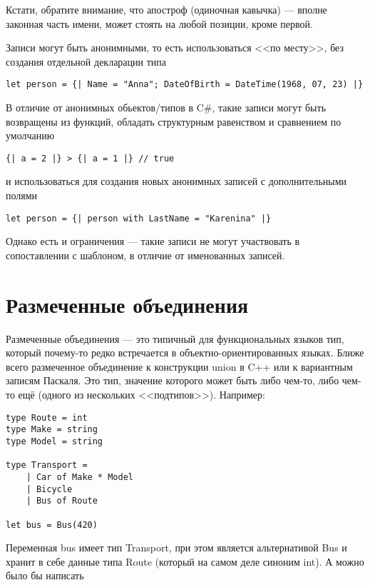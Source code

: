 \documentclass{../../text-style}
\begin{document}
Кстати, обратите внимание, что апостроф (одиночная кавычка) --- вполне законная часть имени, может стоять на любой позиции, кроме первой.

Записи могут быть анонимными, то есть использоваться <<по месту>>, без создания отдельной декларации типа

\begin{verbatim}
let person = {| Name = "Anna"; DateOfBirth = DateTime(1968, 07, 23) |}
\end{verbatim}

В отличие от анонимных обьектов/типов в C\#, такие записи могут быть возвращены из функций, обладать структурным равенством и сравнением по умолчанию

\begin{verbatim}
{| a = 2 |} > {| a = 1 |} // true
\end{verbatim}

и использоваться для создания новых анонимных записей с дополнительными полями

\begin{verbatim}
let person = {| person with LastName = "Karenina" |}
\end{verbatim}

Однако есть и ограничения --- такие записи не могут участвовать в сопоставлении с шаблоном, в отличие от именованных записей.

\section{Размеченные объединения}

Размеченные объединения --- это типичный для функциональных языков тип, который почему-то редко встречается в объектно-ориентированных языках. Ближе всего размеченное объединение к конструкции union в C++ или к вариантным записям Паскаля. Это тип, значение которого может быть либо чем-то, либо чем-то ещё (одного из нескольких <<подтипов>>). Например:

\begin{verbatim}
type Route = int
type Make = string
type Model = string

type Transport =
    | Car of Make * Model
    | Bicycle
    | Bus of Route

let bus = Bus(420)
\end{verbatim}

Переменная bus имеет тип Transport, при этом является альтернативой Bus и хранит в себе данные типа Route (который на самом деле синоним int). А можно было бы написать
\end{document}
